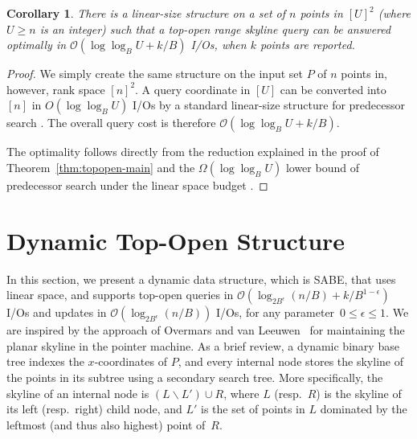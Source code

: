 \documentclass{sig-alternate}
\newtheorem{corollary}{Corollary}
\newcommand{\bigO}{\mathcal{O}}
\renewcommand{\(}{\left(}
\renewcommand{\)}{\right)}
\begin{document}
\begin{corollary} \label{crl:div-rankmain}
	There is a linear-size structure on a set of $n$ points in $[U]^2$ (where $U
	\ge n$ is an integer) such that a top-open range skyline query can be
	answered optimally in $\bigO(\log \log_B U + k/B)$ I/Os, when $k$
  points are reported.
\end{corollary}
\begin{fullenv}
\begin{proof}
  We simply create the same structure on the input set $P$ of $n$ points in, however, rank space
  $[n]^2$. A query coordinate in $[U]$ can be converted into $[n]$ in
  $O(\log\log_B U)$ I/Os by a standard linear-size structure for predecessor
  search \cite{PT06}. The overall query cost is therefore $\bigO(\log \log_B U
  + k/B)$.

  The optimality follows directly from the reduction explained in the proof of
  Theorem~\ref{thm:topopen-main} and the $\Omega(\log \log_B U)$ lower bound of
  predecessor search under the linear space budget \cite{PT06}.
\end{proof}
\end{fullenv}

\section{Dynamic Top-Open Structure} \label{sec:dynamic}


In this section, we present a dynamic data structure, which is SABE, that uses
linear space, and supports top-open queries in $\bigO(\log_{2B^\epsilon} (n/B) +
k/B^{1-\epsilon})$ I/Os and updates in $\bigO(\log_{2B^\epsilon} (n/B))$ I/Os,
for any parameter~$0\leq \epsilon \leq 1$. We are inspired by the approach of
Overmars and van Leeuwen~\cite{OL81} for maintaining the planar skyline in the
pointer machine. As a brief review, a dynamic binary base tree indexes the
$x$-coordinates of $P$, and every internal node stores the skyline of the points
in its subtree using a secondary search tree. More specifically, the skyline of
an internal node is $(L\backslash L') \cup R$, where $L$ (resp.\ $R$) is the
skyline of its left (resp.\ right) child node, and $L'$ is the set of points in
$L$ dominated by the leftmost (and thus also highest) point of~$R$.
\end{document}
